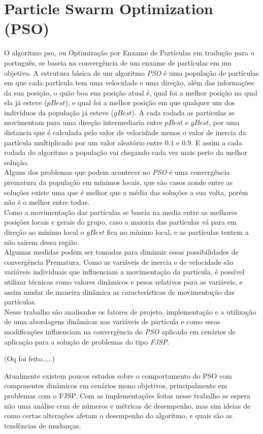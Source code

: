 \section{Particle Swarm Optimization (PSO)}
\indent O algoritmo \gls{pso}, ou Optimização por Enxame de Partículas em tradução para o português, se baseia na convergência de um enxame de partículas em um objetivo.
A estrutura básica de um algoritmo \textit{PSO} é uma população de partículas em que cada partícula tem uma velocidade e uma direção, além das informações da sua posição, o quão boa sua posição atual é, qual foi a melhor posição na qual ela já esteve ($pBest$), e qual foi a melhor posição em que qualquer um dos indivíduos da população já esteve ($gBest$).
A cada rodada as partículas se movimentam para uma direção intermediaria entre $pBest$ e $gBest$, por uma distancia que é calculada pelo valor de velocidade menos o valor de inercia da partícula multiplicado por um valor aleatório entre $0.1$ e $0.9$. 
E assim a cada rodada do algoritmo a população vai chegando cada vez mais perto da melhor solução.\\
\indent Alguns dos problemas que podem acontecer no \textit{PSO} é uma convergência prematura da população em mínimos locais,
que são casos aonde entre as soluções existe uma que é melhor que a média das soluções a sua volta, porém não é o melhor entre todas.\\
Como a movimentação das partículas se baseia na media entre as melhores posições locais e gerais do grupo, caso a maioria das partículas vá para em direção ao mínimo local o $gBest$ fica no mínimo local, e as partículas tentem a não saírem dessa região.\\
\indent Algumas medidas podem ser tomadas para diminuir essas possibilidades de convergência Prematura.
Como as variáveis de inercia e de velocidade são variáveis individuais que influenciam a movimentação da partícula, é possível utilizar técnicas como valores dinâmicos e pesos relativos para as variáveis, e assim mudar de maneira dinâmica as características de movimentação das partículas.\\
\indent Nesse trabalho são analisados os fatores de projeto, implementação e a utilização de uma abordagens dinâmicas nas variáveis de partícula e como essas modificações influenciam na convergência do \textit{PSO} aplicado em cenários de aplicação para a solução de problemas do tipo \textit{FJSP}.


(Oq foi feito.....)

Atualmente existem poucos estudos sobre o comportamento do PSO com componentes dinâmicos em cenários mono objetivos, principalmente em problemas com o FJSP. 
%
Com as implementações feitas nesse trabalho se espera não uma análise crua de números e métricas de desempenho, mas sim ideias de como certas alterações afetam o desempenho do algoritmo, e quais são as tendências de mudanças.